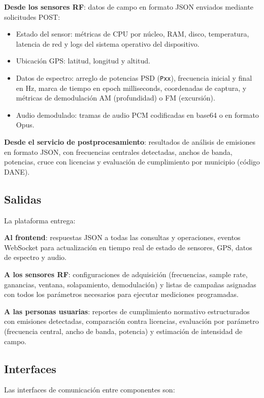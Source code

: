 \textbf{Desde los sensores RF}: datos de campo en formato JSON enviados
mediante solicitudes POST:
\begin{itemize}
    \item Estado del sensor: métricas de CPU por núcleo, RAM, disco,
    temperatura, latencia de red y logs del sistema operativo del dispositivo.
    \item Ubicación GPS: latitud, longitud y altitud.
    \item Datos de espectro: arreglo de potencias PSD (\texttt{Pxx}),
    frecuencia inicial y final en Hz, marca de tiempo en epoch milliseconds,
    coordenadas de captura, y métricas de demodulación AM (profundidad) o FM
    (excursión).
    \item Audio demodulado: tramas de audio PCM codificadas en base64 o en
    formato Opus.
\end{itemize}

\textbf{Desde el servicio de postprocesamiento}: resultados de análisis de
emisiones en formato JSON, con frecuencias centrales detectadas, anchos de
banda, potencias, cruce con licencias y evaluación de cumplimiento por
municipio (código DANE).

\subsection{Salidas}

La plataforma entrega:

\textbf{Al frontend}: respuestas JSON a todas las consultas y operaciones,
eventos WebSocket para actualización en tiempo real de estado de sensores,
GPS, datos de espectro y audio.

\textbf{A los sensores RF}: configuraciones de adquisición (frecuencias,
sample rate, ganancias, ventana, solapamiento, demodulación) y listas de
campañas asignadas con todos los parámetros necesarios para ejecutar
mediciones programadas.

\textbf{A las personas usuarias}: reportes de cumplimiento normativo
estructurados con emisiones detectadas, comparación contra licencias,
evaluación por parámetro (frecuencia central, ancho de banda, potencia) y
estimación de intensidad de campo.

\subsection{Interfaces}

Las interfaces de comunicación entre componentes son:

